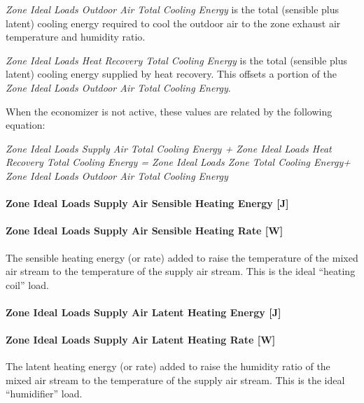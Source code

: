 \emph{Zone Ideal Loads Outdoor Air Total Cooling Energy} is the total (sensible plus latent) cooling energy required to cool the outdoor air to the zone exhaust air temperature and humidity ratio.

\emph{Zone Ideal Loads Heat Recovery Total Cooling Energy} is the total (sensible plus latent) cooling energy supplied by heat recovery. This offsets a portion of the \emph{Zone Ideal Loads Outdoor Air Total Cooling Energy}.

When the economizer is not active, these values are related by the following equation:

\emph{Zone Ideal Loads Supply Air Total Cooling Energy + Zone Ideal Loads Heat Recovery Total Cooling Energy = Zone Ideal Loads Zone Total Cooling Energy+ Zone Ideal Loads Outdoor Air Total Cooling Energy}

\paragraph{Zone Ideal Loads Supply Air Sensible Heating Energy {[}J{]}}\label{zone-ideal-loads-supply-air-sensible-heating-energy-j}

\paragraph{Zone Ideal Loads Supply Air Sensible Heating Rate {[}W{]}}\label{zone-ideal-loads-supply-air-sensible-heating-rate-w}

The sensible heating energy (or rate) added to raise the temperature of the mixed air stream to the temperature of the supply air stream. This is the ideal ``heating coil'' load.

\paragraph{Zone Ideal Loads Supply Air Latent Heating Energy {[}J{]}}\label{zone-ideal-loads-supply-air-latent-heating-energy-j}

\paragraph{Zone Ideal Loads Supply Air Latent Heating Rate {[}W{]}}\label{zone-ideal-loads-supply-air-latent-heating-rate-w}

The latent heating energy (or rate) added to raise the humidity ratio of the mixed air stream to the temperature of the supply air stream. This is the ideal ``humidifier'' load.

